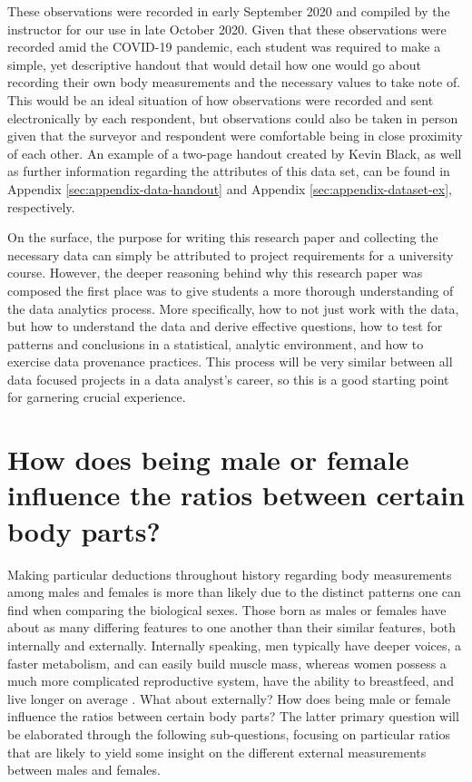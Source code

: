 \documentclass[]{article}
\begin{document}
\vspace{0.25cm}

These observations were recorded in early September 2020 and compiled by
the instructor for our use in late October 2020. Given that these
observations were recorded amid the COVID-19 pandemic, each student was
required to make a simple, yet descriptive handout that would detail how
one would go about recording their own body measurements and the
necessary values to take note of. This would be an ideal situation of
how observations were recorded and sent electronically by each
respondent, but observations could also be taken in person given that
the surveyor and respondent were comfortable being in close proximity of
each other. An example of a two-page handout created by Kevin Black, as
well as further information regarding the attributes of this data set,
can be found in Appendix \ref{sec:appendix-data-handout} and Appendix
\ref{sec:appendix-dataset-ex}, respectively.

\vspace{0.25cm}

On the surface, the purpose for writing this research paper and
collecting the necessary data can simply be attributed to project
requirements for a university course. However, the deeper reasoning
behind why this research paper was composed the first place was to give
students a more thorough understanding of the data analytics process.
More specifically, how to not just work with the data, but how to
understand the data and derive effective questions, how to test for
patterns and conclusions in a statistical, analytic environment, and how
to exercise data provenance practices. This process will be very similar
between all data focused projects in a data analyst's career, so this is
a good starting point for garnering crucial experience.

\section{How does being male or female influence the ratios between certain body parts?}
\label{sec:rq}

Making particular deductions throughout history regarding body
measurements among males and females is more than likely due to the
distinct patterns one can find when comparing the biological sexes.
Those born as males or females have about as many differing features to
one another than their similar features, both internally and externally.
Internally speaking, men typically have deeper voices, a faster
metabolism, and can easily build muscle mass, whereas women possess a
much more complicated reproductive system, have the ability to
breastfeed, and live longer on average \citep{Wolchover:2011}. What
about externally? How does being male or female influence the ratios
between certain body parts? The latter primary question will be
elaborated through the following sub-questions, focusing on particular
ratios that are likely to yield some insight on the different external
measurements between males and females.
\end{document}
